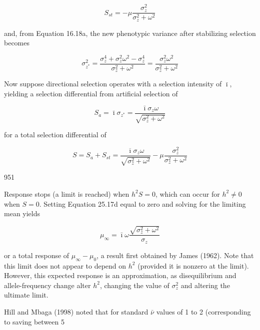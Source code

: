 \documentclass{article}
\begin{document}
\begin{equation}
S_{s t}=-\mu\frac{\sigma_{z}^{2}}{\sigma_{z}^{2}+\omega^{2}}
\tag{25.17a}
\label{eq:25_17a}
\end{equation}

and, from Equation 16.18a, the new phenotypic variance after stabilizing selection becomes

\begin{equation}
\sigma_{z^{*}}^{2}=\frac{\sigma_{z}^{4}+\sigma_{z}^{2}\omega^{2}-\sigma_{z}^{4}}{\sigma_{z}^{2}+\omega^{2}}=\frac{\sigma_{z}^{2}\omega^{2}}{\sigma_{z}^{2}+\omega^{2}}
\tag{25.17b}
\label{eq:25_17b}
\end{equation}

Now suppose directional selection operates with a selection intensity of  $ \bar{\imath} $, yielding a selection differential from artificial selection of

\begin{equation}
S_{a}=\bar{\imath}\sigma_{z^{*}}=\frac{\bar{\imath}\sigma_{z}\omega}{\sqrt{\sigma_{z}^{2}+\omega^{2}}}
\tag{25.17c}
\label{eq:25_17c}
\end{equation}

for a total selection differential of

\begin{equation}
S=S_{a}+S_{s t}=\frac{\overline{\imath}\sigma_{z}\omega}{\sqrt{\sigma_{z}^{2}+\omega^{2}}}-\mu\frac{\sigma_{z}^{2}}{\sigma_{z}^{2}+\omega^{2}}
\tag{25.17d}
\label{eq:25_17d}
\end{equation}

951

Response stops (a limit is reached) when  $ h^2S = 0 $, which can occur for  $ h^2 \neq 0 $ when  $ S = 0 $. Setting Equation 25.17d equal to zero and solving for the limiting mean yields

\begin{equation}
\mu_{\infty}=\bar{\imath}\omega\frac{\sqrt{\sigma_{z}^{2}+\omega^{2}}}{\sigma_{z}}
\tag{25.18a}
\label{eq:25_18a}
\end{equation}

or a total response of  $ \mu_{\infty} - \mu_0 $, a result first obtained by James (1962). Note that this limit does not appear to depend on  $ h^2 $ (provided it is nonzero at the limit). However, this expected response is an approximation, as disequilibrium and allele-frequency change alter  $ h^2 $, changing the value of  $ \sigma_z^2 $ and altering the ultimate limit.

Hill and Mbaga (1998) noted that for standard  $ \bar{\nu} $ values of 1 to 2 (corresponding to saving between 5%
\end{document}
